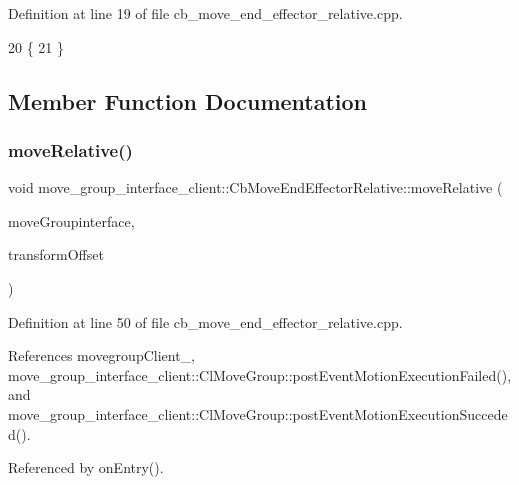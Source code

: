 Definition at line 19 of file cb\+\_\+move\+\_\+end\+\_\+effector\+\_\+relative.\+cpp.


\begin{DoxyCode}
20 \{
21 \}
\end{DoxyCode}


\subsection{Member Function Documentation}
\mbox{\label{classmove__group__interface__client_1_1CbMoveEndEffectorRelative_a8f64d14c4a398b455b1953ae61cc58bc}} 
\subsubsection{\texorpdfstring{move\+Relative()}{moveRelative()}}
{\footnotesize\ttfamily void move\+\_\+group\+\_\+interface\+\_\+client\+::\+Cb\+Move\+End\+Effector\+Relative\+::move\+Relative (\begin{DoxyParamCaption}\item[{moveit\+::planning\+\_\+interface\+::\+Move\+Group\+Interface \&}]{move\+Groupinterface,  }\item[{geometry\+\_\+msgs\+::\+Transform \&}]{transform\+Offset }\end{DoxyParamCaption})\hspace{0.3cm}{\ttfamily [protected]}}



Definition at line 50 of file cb\+\_\+move\+\_\+end\+\_\+effector\+\_\+relative.\+cpp.



References movegroup\+Client\+\_\+, move\+\_\+group\+\_\+interface\+\_\+client\+::\+Cl\+Move\+Group\+::post\+Event\+Motion\+Execution\+Failed(), and move\+\_\+group\+\_\+interface\+\_\+client\+::\+Cl\+Move\+Group\+::post\+Event\+Motion\+Execution\+Succeded().



Referenced by on\+Entry().


